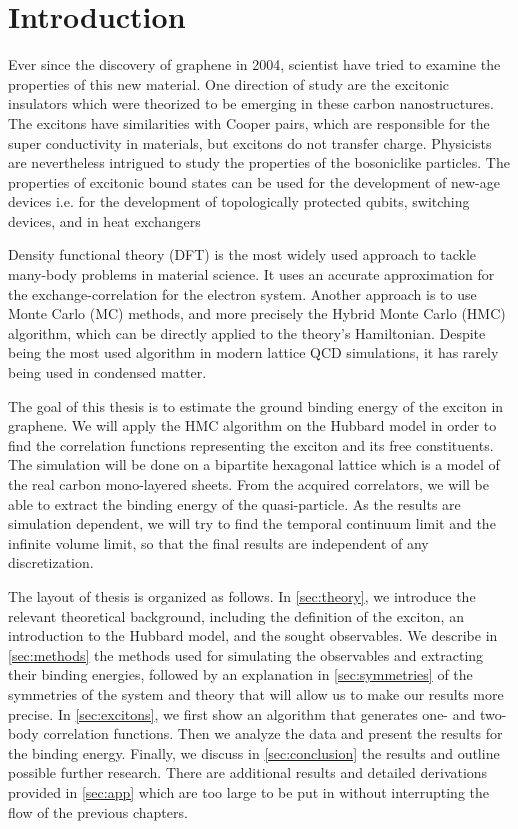 
\chapter{Introduction}
\label{sec:intro}

Ever since the discovery of graphene in 2004, scientist have tried to examine the properties of this new material. One direction of study are the excitonic insulators which were theorized to be emerging in these carbon nanostructures. The excitons have similarities with Cooper pairs, which are responsible for the super conductivity in materials, but excitons do not transfer charge. Physicists are nevertheless intrigued to study the properties of the bosoniclike particles. The properties of excitonic bound states can be used for the development of new-age devices i.e. for the development of topologically protected qubits, switching devices, and in heat exchangers 

Density functional theory (DFT) is the most widely used approach to tackle many-body problems in material science. It uses an accurate approximation for the exchange-correlation for the electron system. Another approach is to use Monte Carlo (MC) methods, and more precisely the Hybrid Monte Carlo (HMC) algorithm, which can be directly applied to the theory's Hamiltonian. Despite being the most used algorithm in modern lattice  QCD simulations, it has rarely being used in condensed matter.

The goal of this thesis is to estimate the ground binding energy of the exciton in graphene. We will apply the HMC algorithm on the Hubbard model in order to find the correlation functions representing the exciton and its free constituents. The simulation will be done on a bipartite hexagonal lattice which is a model of the real carbon mono-layered sheets. From the acquired correlators, we will be able to extract the binding energy of the quasi-particle. As the results are simulation dependent, we will try to find the temporal continuum limit and the infinite volume limit, so that the final results are independent of any discretization.

The layout of thesis is organized as follows. In \cref{sec:theory}, we introduce the relevant theoretical background, including the definition of the exciton, an introduction to the Hubbard model, and the sought observables. We describe in \cref{sec:methods} the methods used for simulating the observables and extracting their binding energies, followed by an explanation in \cref{sec:symmetries} of the symmetries of the system and theory that will allow us to make our results more precise. In \cref{sec:excitons}, we first show an algorithm that generates one- and two-body correlation functions. Then we analyze the data and present the results for the binding energy. Finally, we discuss in \cref{sec:conclusion} the results and outline possible further research. There are additional results and detailed derivations provided in \cref{sec:app} which are too large to be put in without interrupting the flow of the previous chapters.

